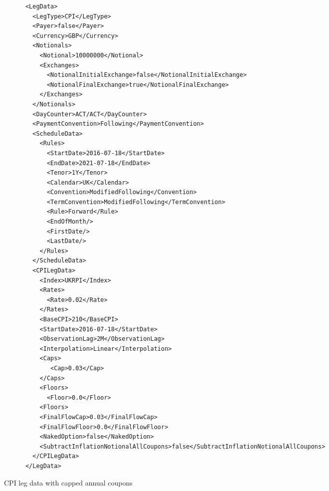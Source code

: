 \begin{listing}[H]
\begin{verbatim}
      <LegData>
        <LegType>CPI</LegType>
        <Payer>false</Payer>
        <Currency>GBP</Currency>
        <Notionals>
          <Notional>10000000</Notional>
          <Exchanges>
            <NotionalInitialExchange>false</NotionalInitialExchange>
            <NotionalFinalExchange>true</NotionalFinalExchange>
          </Exchanges>          
        </Notionals>
        <DayCounter>ACT/ACT</DayCounter>
        <PaymentConvention>Following</PaymentConvention>
        <ScheduleData>
          <Rules>
            <StartDate>2016-07-18</StartDate>
            <EndDate>2021-07-18</EndDate>
            <Tenor>1Y</Tenor>
            <Calendar>UK</Calendar>
            <Convention>ModifiedFollowing</Convention>
            <TermConvention>ModifiedFollowing</TermConvention>
            <Rule>Forward</Rule>
            <EndOfMonth/>
            <FirstDate/>
            <LastDate/>
          </Rules>
        </ScheduleData>
        <CPILegData>
          <Index>UKRPI</Index>
          <Rates>
            <Rate>0.02</Rate>
          </Rates>
          <BaseCPI>210</BaseCPI>
          <StartDate>2016-07-18</StartDate>
          <ObservationLag>2M</ObservationLag>
          <Interpolation>Linear</Interpolation>
          <Caps>
             <Cap>0.03</Cap>
          </Caps>
          <Floors>
            <Floor>0.0</Floor>
          <Floors>
          <FinalFlowCap>0.03</FinalFlowCap>
          <FinalFlowFloor>0.0</FinalFlowFloor>
          <NakedOption>false</NakedOption>
          <SubtractInflationNotionalAllCoupons>false</SubtractInflationNotionalAllCoupons>         
        </CPILegData>
      </LegData>
\end{verbatim}
\caption{CPI leg data with capped annual coupons}
\label{lst:cpilegdata}
\end{listing}

